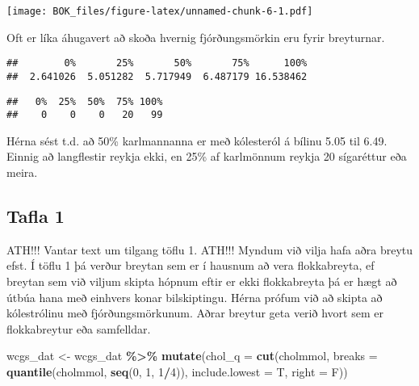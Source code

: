\documentclass[
]{book}
\newenvironment{Shaded}{\begin{snugshade}}{\end{snugshade}}
\newcommand{\DataTypeTok}[1]{\textcolor[rgb]{0.13,0.29,0.53}{#1}}
\newcommand{\DecValTok}[1]{\textcolor[rgb]{0.00,0.00,0.81}{#1}}
\newcommand{\KeywordTok}[1]{\textcolor[rgb]{0.13,0.29,0.53}{\textbf{#1}}}
\newcommand{\NormalTok}[1]{#1}
\newcommand{\OperatorTok}[1]{\textcolor[rgb]{0.81,0.36,0.00}{\textbf{#1}}}
\newcommand{\StringTok}[1]{\textcolor[rgb]{0.31,0.60,0.02}{#1}}
\begin{document}
\texttt{[image: BOK\_files/figure-latex/unnamed-chunk-6-1.pdf]}

Oft er líka áhugavert að skoða hvernig fjórðungsmörkin eru fyrir breyturnar.

\begin{Shaded}
\end{Shaded}

\begin{verbatim}
##        0%       25%       50%       75%      100% 
##  2.641026  5.051282  5.717949  6.487179 16.538462
\end{verbatim}

\begin{Shaded}
\end{Shaded}

\begin{verbatim}
##   0%  25%  50%  75% 100% 
##    0    0    0   20   99
\end{verbatim}

Hérna sést t.d. að 50\% karlmannanna er með kólesteról á bílinu 5.05 til 6.49. Einnig að langflestir reykja ekki, en 25\% af karlmönnum reykja 20 sígaréttur eða meira.

\hypertarget{tafla-1}{%
\subsection{Tafla 1}\label{tafla-1}}

ATH!!! Vantar text um tilgang töflu 1.
ATH!!! Myndum við vilja hafa aðra breytu efst.
Í töflu 1 þá verður breytan sem er í hausnum að vera flokkabreyta, ef breytan sem við viljum skipta hópnum eftir er ekki flokkabreyta þá er hægt að útbúa hana með einhvers konar bilskiptingu. Hérna prófum við að skipta að kólestrólinu með fjórðungsmörkunum. Aðrar breytur geta verið hvort sem er flokkabreytur eða samfelldar.

\begin{Shaded}
\begin{Highlighting}[]
\NormalTok{wcgs\_dat <{-}}\StringTok{ }\NormalTok{wcgs\_dat }\OperatorTok{\%>\%}\StringTok{ }
\StringTok{  }\KeywordTok{mutate}\NormalTok{(}\DataTypeTok{chol\_q =} \KeywordTok{cut}\NormalTok{(cholmmol, }\DataTypeTok{breaks =} \KeywordTok{quantile}\NormalTok{(cholmmol, }\KeywordTok{seq}\NormalTok{(}\DecValTok{0}\NormalTok{, }\DecValTok{1}\NormalTok{, }\DecValTok{1}\OperatorTok{/}\DecValTok{4}\NormalTok{)), }
                      \DataTypeTok{include.lowest =}\NormalTok{ T, }\DataTypeTok{right =}\NormalTok{ F))}
\end{Highlighting}
\end{Shaded}
\end{document}
